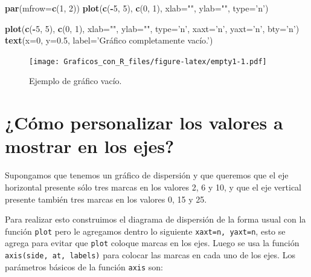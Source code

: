 \documentclass[10pt,]{krantz}
\makeatletter
\newenvironment{Shaded}{\begin{snugshade}}{\end{snugshade}}
\newcommand{\KeywordTok}[1]{\textcolor[rgb]{0.13,0.29,0.53}{\textbf{#1}}}
\newcommand{\DataTypeTok}[1]{\textcolor[rgb]{0.13,0.29,0.53}{#1}}
\newcommand{\DecValTok}[1]{\textcolor[rgb]{0.00,0.00,0.81}{#1}}
\newcommand{\FloatTok}[1]{\textcolor[rgb]{0.00,0.00,0.81}{#1}}
\newcommand{\StringTok}[1]{\textcolor[rgb]{0.31,0.60,0.02}{#1}}
\newcommand{\OperatorTok}[1]{\textcolor[rgb]{0.81,0.36,0.00}{\textbf{#1}}}
\newcommand{\NormalTok}[1]{#1}
\newenvironment{kframe}{%
\medskip{}
\setlength{\fboxsep}{.8em}
 \def\at@end@of@kframe{}%
 \ifinner\ifhmode%
  \def\at@end@of@kframe{\end{minipage}}%
  \begin{minipage}{\columnwidth}%
 \fi\fi%
 \def\FrameCommand##1{\hskip\@totalleftmargin \hskip-\fboxsep
 \colorbox{shadecolor}{##1}\hskip-\fboxsep
     \hskip-\linewidth \hskip-\@totalleftmargin \hskip\columnwidth}%
 \MakeFramed {\advance\hsize-\width
   \@totalleftmargin\z@ \linewidth\hsize
   \@setminipage}}%
 {\par\unskip\endMakeFramed%
 \at@end@of@kframe}
\renewenvironment{Shaded}{\begin{kframe}}{\end{kframe}}
\makeatother
\begin{document}
\begin{Shaded}
\begin{Highlighting}[]
\KeywordTok{par}\NormalTok{(}\DataTypeTok{mfrow=}\KeywordTok{c}\NormalTok{(}\DecValTok{1}\NormalTok{, }\DecValTok{2}\NormalTok{))}
\KeywordTok{plot}\NormalTok{(}\KeywordTok{c}\NormalTok{(}\OperatorTok{-}\DecValTok{5}\NormalTok{, }\DecValTok{5}\NormalTok{), }\KeywordTok{c}\NormalTok{(}\DecValTok{0}\NormalTok{, }\DecValTok{1}\NormalTok{), }\DataTypeTok{xlab=}\StringTok{""}\NormalTok{, }\DataTypeTok{ylab=}\StringTok{""}\NormalTok{, }\DataTypeTok{type=}\StringTok{'n'}\NormalTok{)}

\KeywordTok{plot}\NormalTok{(}\KeywordTok{c}\NormalTok{(}\OperatorTok{-}\DecValTok{5}\NormalTok{, }\DecValTok{5}\NormalTok{), }\KeywordTok{c}\NormalTok{(}\DecValTok{0}\NormalTok{, }\DecValTok{1}\NormalTok{), }\DataTypeTok{xlab=}\StringTok{""}\NormalTok{, }\DataTypeTok{ylab=}\StringTok{""}\NormalTok{, }\DataTypeTok{type=}\StringTok{'n'}\NormalTok{,}
     \DataTypeTok{xaxt=}\StringTok{'n'}\NormalTok{, }\DataTypeTok{yaxt=}\StringTok{'n'}\NormalTok{, }\DataTypeTok{bty=}\StringTok{'n'}\NormalTok{)}
\KeywordTok{text}\NormalTok{(}\DataTypeTok{x=}\DecValTok{0}\NormalTok{, }\DataTypeTok{y=}\FloatTok{0.5}\NormalTok{,}
     \DataTypeTok{label=}\StringTok{'Gráfico completamente vacío.'}\NormalTok{)}
\end{Highlighting}
\end{Shaded}

\begin{figure}
\centering
\texttt{[image: Graficos\_con\_R\_files/figure-latex/empty1-1.pdf]}
\caption{\label{fig:empty1}Ejemplo de gráfico vacío.}
\end{figure}

\section{¿Cómo personalizar los valores a mostrar en los
ejes?}\label{como-personalizar-los-valores-a-mostrar-en-los-ejes}

Supongamos que tenemos un gráfico de dispersión y que queremos que el
eje horizontal presente sólo tres marcas en los valores 2, 6 y 10, y que
el eje vertical presente también tres marcas en los valores 0, 15 y 25.

Para realizar esto construimos el diagrama de dispersión de la forma
usual con la función \texttt{plot} pero le agregamos dentro lo siguiente
\texttt{xaxt=\textquotesingle{}n\textquotesingle{},\ yaxt=\textquotesingle{}n\textquotesingle{}},
esto se agrega para evitar que \texttt{plot} coloque marcas en los ejes.
Luego se usa la función \texttt{axis(side,\ at,\ labels)} para colocar
las marcas en cada uno de los ejes. Los parámetros básicos de la función
\texttt{axis} son:
\end{document}
